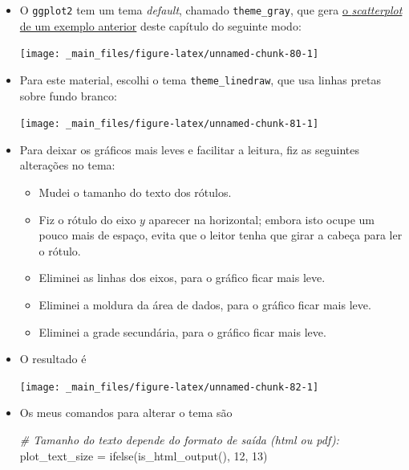 \documentclass[
  11pt]{report}
\newenvironment{Shaded}{\begin{snugshade}}{\end{snugshade}}
\newcommand{\CommentTok}[1]{\textcolor[rgb]{0.56,0.35,0.01}{\textit{#1}}}
\newcommand{\DecValTok}[1]{\textcolor[rgb]{0.00,0.00,0.81}{#1}}
\newcommand{\FunctionTok}[1]{\textcolor[rgb]{0.00,0.00,0.00}{#1}}
\newcommand{\NormalTok}[1]{#1}
\newcommand{\OtherTok}[1]{\textcolor[rgb]{0.56,0.35,0.01}{#1}}
\renewenvironment{Shaded}{
    \begin{mdframed}[%
      roundcorner=2pt,%
      innerleftmargin=5pt,%
      innerrightmargin=5pt,%
      topline=true,%
      leftline=true,%
      rightline=true,%
      bottomline=true,%
      linewidth=0.5pt,%
      linecolor=black!20,%
      backgroundcolor=black!2,%
      skipabove=2ex,%
      skipbelow=2.5ex%
    ]%
  }
  {
    \end{mdframed}
  }
\begin{document}
\begin{itemize}
\item
  O \texttt{ggplot2} tem um tema \emph{default}, chamado \texttt{theme\_gray}, que gera \protect\hyperlink{grafico4}{o \emph{scatterplot} de um exemplo anterior} deste capítulo do seguinte modo:

  \begin{center}\texttt{[image: \_main\_files/figure-latex/unnamed-chunk-80-1]} \end{center}
\item
  Para este material, escolhi o tema \texttt{theme\_linedraw}, que usa linhas pretas sobre fundo branco:

  \begin{center}\texttt{[image: \_main\_files/figure-latex/unnamed-chunk-81-1]} \end{center}
\item
  Para deixar os gráficos mais leves e facilitar a leitura, fiz as seguintes alterações no tema:

  \begin{itemize}
  \item
    Mudei o tamanho do texto dos rótulos.
  \item
    Fiz o rótulo do eixo $y$ aparecer na horizontal; embora isto ocupe um pouco mais de espaço, evita que o leitor tenha que girar a cabeça para ler o rótulo.
  \item
    Eliminei as linhas dos eixos, para o gráfico ficar mais leve.
  \item
    Eliminei a moldura da área de dados, para o gráfico ficar mais leve.
  \item
    Eliminei a grade secundária, para o gráfico ficar mais leve.
  \end{itemize}
\item
  O resultado é

  \begin{center}\texttt{[image: \_main\_files/figure-latex/unnamed-chunk-82-1]} \end{center}
\item
  Os meus comandos para alterar o tema são

\begin{Shaded}
\begin{Highlighting}[]
\CommentTok{\# Tamanho do texto depende do formato de saída (html ou pdf):}
\NormalTok{plot\_text\_size }\OtherTok{=} \FunctionTok{ifelse}\NormalTok{(}\FunctionTok{is\_html\_output}\NormalTok{(), }\DecValTok{12}\NormalTok{, }\DecValTok{13}\NormalTok{)}


\end{Highlighting}
\end{Shaded}
\end{itemize}
\end{document}
